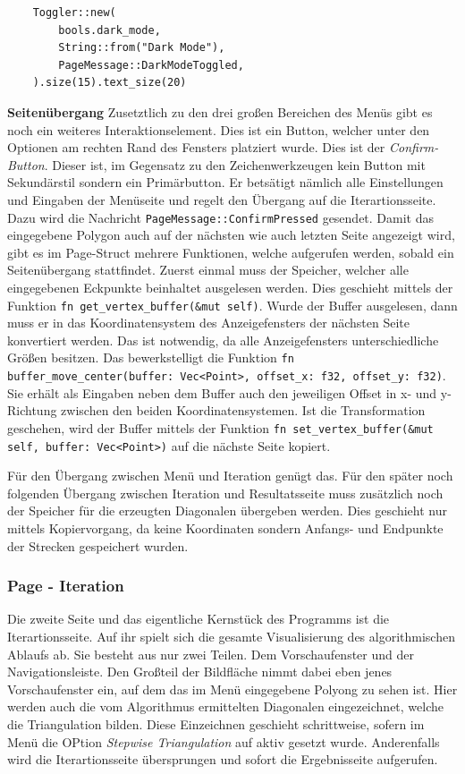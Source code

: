 \begin{lstlisting}
    Toggler::new(
        bools.dark_mode,
        String::from("Dark Mode"),
        PageMessage::DarkModeToggled,
    ).size(15).text_size(20)
\end{lstlisting}\pagebreak

\textbf{\large{Seitenübergang}}\linebreak
Zusetztlich zu den drei großen Bereichen des Menüs gibt es noch ein weiteres Interaktionselement. Dies ist ein Button, welcher unter den Optionen am rechten Rand des Fensters platziert wurde.
Dies ist der \emph{Confirm-Button}. Dieser ist, im Gegensatz zu den Zeichenwerkzeugen kein Button mit Sekundärstil sondern ein Primärbutton. Er betsätigt nämlich alle Einstellungen und Eingaben der Menüseite und
regelt den Übergang auf die Iterartionsseite. Dazu wird die Nachricht \lstinline{PageMessage::ConfirmPressed} gesendet. Damit das eingegebene Polygon auch auf der nächsten wie auch letzten Seite angezeigt wird, gibt es im Page-Struct
mehrere Funktionen, welche aufgerufen werden, sobald ein Seitenübergang stattfindet. Zuerst einmal muss der Speicher, welcher alle eingegebenen Eckpunkte beinhaltet ausgelesen werden. Dies geschieht mittels der Funktion 
\lstinline{fn get_vertex_buffer(&mut self)}. Wurde der Buffer ausgelesen, dann muss er in das Koordinatensystem des Anzeigefensters der nächsten Seite konvertiert werden. Das ist notwendig, da alle Anzeigefensters unterschiedliche Größen besitzen.
Das bewerkstelligt die Funktion \lstinline{fn buffer_move_center(buffer: Vec<Point>, offset_x: f32, offset_y: f32)}. Sie erhält als Eingaben neben dem Buffer auch den jeweiligen Offset in x- und y-Richtung
zwischen den beiden Koordinatensystemen. Ist die Transformation geschehen, wird der Buffer mittels der Funktion \lstinline{fn set_vertex_buffer(&mut self, buffer: Vec<Point>)} auf die nächste Seite kopiert.

Für den Übergang zwischen Menü und Iteration genügt das. Für den später noch folgenden Übergang zwischen Iteration und Resultatsseite muss zusätzlich noch der Speicher für die erzeugten Diagonalen übergeben werden.
Dies geschieht nur mittels Kopiervorgang, da keine Koordinaten sondern Anfangs- und Endpunkte der Strecken gespeichert wurden.

\subsubsection{Page - Iteration}

Die zweite Seite und das eigentliche Kernstück des Programms ist die Iterartionsseite. Auf ihr spielt sich die gesamte Visualisierung des algorithmischen Ablaufs ab.
Sie besteht aus nur zwei Teilen. Dem Vorschaufenster und der Navigationsleiste. Den Großteil der Bildfläche nimmt dabei eben jenes Vorschaufenster ein, auf dem das im Menü eingegebene 
Polyong zu sehen ist. Hier werden auch die vom Algorithmus ermittelten Diagonalen eingezeichnet, welche die Triangulation bilden. Diese Einzeichnen geschieht schrittweise, sofern 
im Menü die OPtion \emph{Stepwise Triangulation} auf aktiv gesetzt wurde. Anderenfalls wird die Iterartionsseite übersprungen und sofort die Ergebnisseite aufgerufen.

